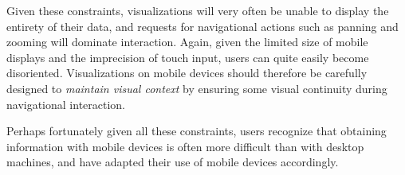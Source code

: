 Given these constraints, visualizations will very often be unable to display the entirety of their data, and requests for navigational actions such as panning and zooming will dominate interaction. Again, given the limited size of mobile displays and the imprecision of touch input, users can quite easily become disoriented. Visualizations on mobile devices should therefore be carefully designed to \textit{maintain visual context} by ensuring some visual continuity during navigational interaction.

Perhaps fortunately given all these constraints, users recognize that obtaining information with mobile devices is often more difficult than with desktop machines, and have adapted their use of mobile devices accordingly.


